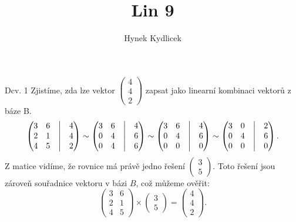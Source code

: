 \documentclass[a4paper]{article}
\title{Lin 9}
\author{Hynek Kydlicek}
\begin{document}
\maketitle
\begin{section}{Dcv. 1}
    Zjistíme, zda lze vektor
    $\begin{pmatrix} 4 \\ 4 \\ 2 \end{pmatrix}$ zapsat jako linearní kombinaci vektorů z báze B.
\begin{align*}
    \begin{pmatrix}
        3 & 6 & \bigm| & 4\\
        2 & 1 & \bigm| & 4\\
        4 & 5 & \bigm| & 2
    \end{pmatrix} 
    \sim
    \begin{pmatrix}
        3 & 6 & \bigm| & 4\\
        0 & 4 & \bigm| & 6\\
        0 & 4 & \bigm| & 6
    \end{pmatrix} 
    \sim
    \begin{pmatrix}
        3 & 6 & \bigm| & 4\\
        0 & 4 & \bigm| & 6\\
        0 & 0 & \bigm| & 0
    \end{pmatrix} 
    \sim
    \begin{pmatrix}
        3 & 0 & \bigm| & 2\\
        0 & 4 & \bigm| & 6\\
        0 & 0 & \bigm| & 0
    \end{pmatrix} 
.\end{align*}
Z matice vidíme, že rovnice má právě jedno řešení $\begin{pmatrix}3 \\ 5 \end{pmatrix}$.
Toto řešení jsou zároveň souřadnice vektoru v bázi $B$, což můžeme ověřit:
\[
    \begin{pmatrix}
        3 & 6\\
        2 & 1\\
        4 & 5
    \end{pmatrix}
    \times
    \begin{pmatrix} 3 \\ 5 \end{pmatrix}
    =
    \begin{pmatrix}
        4 \\
        4 \\
        2
    \end{pmatrix} 
.\] 
\end{section}
\end{document}
